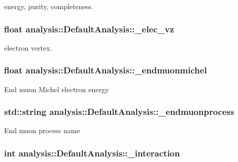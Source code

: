 energy, purity, completeness. \hypertarget{classanalysis_1_1DefaultAnalysis_ad728b8375e4d62c128d767fcebbab1d9}{
\subsubsection[{\-\_\-elec\-\_\-vz}]{\setlength{\rightskip}{0pt plus 5cm}float analysis\-::\-Default\-Analysis\-::\-\_\-elec\-\_\-vz\hspace{0.3cm}{\ttfamily [private]}}}\label{classanalysis_1_1DefaultAnalysis_ad728b8375e4d62c128d767fcebbab1d9}
electron vertex. \hypertarget{classanalysis_1_1DefaultAnalysis_a3797bcb310074825add03ce03175fdc3}{
\subsubsection[{\-\_\-endmuonmichel}]{\setlength{\rightskip}{0pt plus 5cm}float analysis\-::\-Default\-Analysis\-::\-\_\-endmuonmichel\hspace{0.3cm}{\ttfamily [private]}}}\label{classanalysis_1_1DefaultAnalysis_a3797bcb310074825add03ce03175fdc3}
End muon Michel electron energy \hypertarget{classanalysis_1_1DefaultAnalysis_a8cbb24a231e167258d2914f92bc4af22}{
\subsubsection[{\-\_\-endmuonprocess}]{\setlength{\rightskip}{0pt plus 5cm}std\-::string analysis\-::\-Default\-Analysis\-::\-\_\-endmuonprocess\hspace{0.3cm}{\ttfamily [private]}}}\label{classanalysis_1_1DefaultAnalysis_a8cbb24a231e167258d2914f92bc4af22}
End muon process name \hypertarget{classanalysis_1_1DefaultAnalysis_a35c01b4be6d678e89cada927ab2ba45c}{
\subsubsection[{\-\_\-interaction}]{\setlength{\rightskip}{0pt plus 5cm}int analysis\-::\-Default\-Analysis\-::\-\_\-interaction\hspace{0.3cm}{\ttfamily [private]}}}\label{classanalysis_1_1DefaultAnalysis_a35c01b4be6d678e89cada927ab2ba45c}
